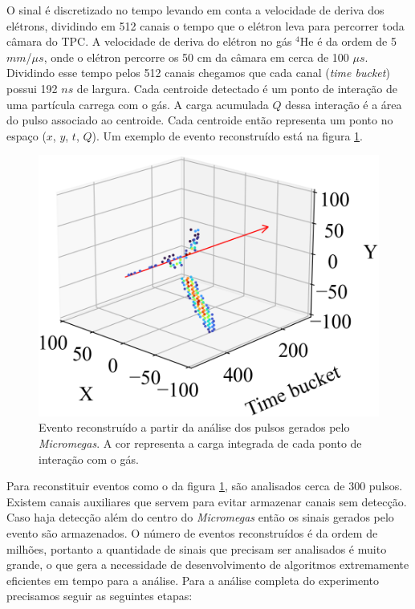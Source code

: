 \documentclass[a4paper,12pt,oneside]{book}
\begin{document}
\par O sinal é discretizado no tempo levando em conta a velocidade de deriva dos elétrons, dividindo em 512 canais o tempo que o elétron leva para percorrer toda câmara do TPC\cite{josh_bradt, pattpc}. A velocidade de deriva do elétron no gás $^4$He é da ordem de 5 $mm$/$\mu s$\cite{pattpc}, onde o elétron percorre os 50 cm da câmara em cerca de 100 $\mu s$. Dividindo esse tempo pelos 512 canais chegamos que cada canal (\textit{time bucket}) possui 192 $ns$ de largura. Cada centroide detectado é um ponto de interação de uma partícula carrega com o gás. A carga acumulada $Q$ dessa interação é a área do pulso associado ao centroide. Cada centroide então representa um ponto no espaço ($x$, $y$, $t$, $Q$). Um exemplo de evento reconstruído está na figura \ref{fig:event_cap_exp}.

\begin{figure}[H]
    \centering
    \includegraphics[scale = 0.40]{figs/event_cap_exp.png}
    \caption{Evento reconstruído a partir da análise dos pulsos gerados pelo \textit{Micromegas}. A cor representa a carga integrada de cada ponto de interação com o gás.}
    \label{fig:event_cap_exp}
\end{figure}

\par Para reconstituir eventos como o da figura \ref{fig:event_cap_exp}, são analisados cerca de 300 pulsos. Existem canais auxiliares que servem para evitar armazenar canais sem detecção. Caso haja detecção além do centro do \textit{Micromegas} então os sinais gerados pelo evento são armazenados\cite{josh_bradt, attpc}. O número de eventos reconstruídos é da ordem de milhões, portanto a quantidade de sinais que precisam ser analisados é muito grande, o que gera a necessidade de desenvolvimento de algoritmos extremamente eficientes em tempo para a análise. Para a análise completa do experimento precisamos seguir as seguintes etapas:
\end{document}
